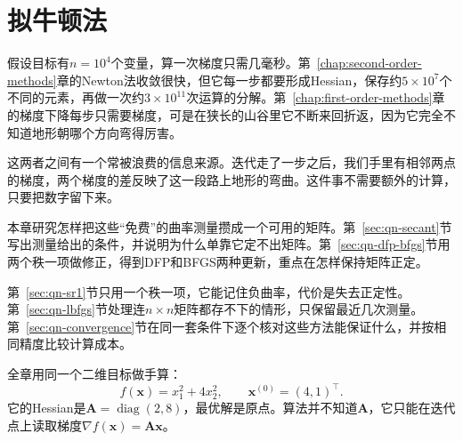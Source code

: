 \chapter{拟牛顿法}
\label{chap:quasi-newton}

假设目标有$n=10^4$个变量，算一次梯度只需几毫秒。第~\ref{chap:second-order-methods}章的Newton法收敛很快，但它每一步都要形成Hessian，保存约$5\times10^7$个不同的元素，再做一次约$3\times10^{11}$次运算的分解。第~\ref{chap:first-order-methods}章的梯度下降每步只需要梯度，可是在狭长的山谷里它不断来回折返，因为它完全不知道地形朝哪个方向弯得厉害。

这两者之间有一个常被浪费的信息来源。迭代走了一步之后，我们手里有相邻两点的梯度，两个梯度的差反映了这一段路上地形的弯曲。这件事不需要额外的计算，只要把数字留下来。

本章研究怎样把这些“免费”的曲率测量攒成一个可用的矩阵。第~\ref{sec:qn-secant}节写出测量给出的条件，并说明为什么单靠它定不出矩阵。第~\ref{sec:qn-dfp-bfgs}节用两个秩一项做修正，得到DFP和BFGS两种更新，重点在怎样保持矩阵正定。

第~\ref{sec:qn-sr1}节只用一个秩一项，它能记住负曲率，代价是失去正定性。第~\ref{sec:qn-lbfgs}节处理连$n\times n$矩阵都存不下的情形，只保留最近几次测量。第~\ref{sec:qn-convergence}节在同一套条件下逐个核对这些方法能保证什么，并按相同精度比较计算成本。

全章用同一个二维目标做手算：
\begin{equation}
 f(\bm{x})=x_1^2+4x_2^2,\qquad \bm{x}^{(0)}=(4,1)^\top.
 \label{eq:qn-running-example}
\end{equation}
它的Hessian是$\bm{A}=\operatorname{diag}(2,8)$，最优解是原点。算法并不知道$\bm{A}$，它只能在迭代点上读取梯度$\nabla f(\bm{x})=\bm{A}\bm{x}$。







